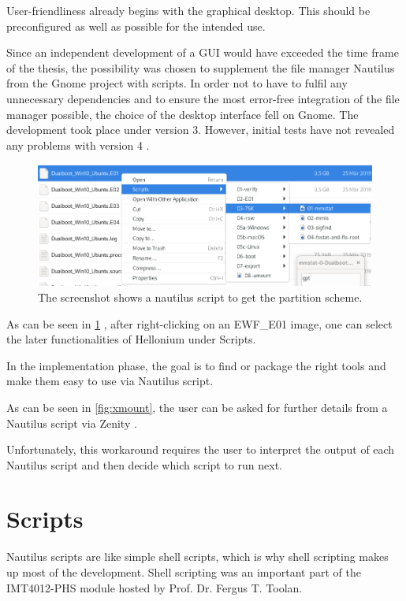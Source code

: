 User-friendliness already begins with the graphical desktop. This should be preconfigured as well as possible for the intended use.

Since an independent development of a GUI would have exceeded the time frame of the thesis, the possibility was chosen to supplement the file manager Nautilus from the Gnome project with scripts. In order not to have to fulfil any unnecessary dependencies and to ensure the most error-free integration of the file manager possible, the choice of the desktop interface fell on Gnome. The development took place under version 3. However, initial tests have not revealed any problems with version 4 \cite{Gnome}.

\begin{figure}[htbp]  %
  \centering
  \includegraphics[width=.5\textwidth]{figures/mmstat-gpt.png}
  \caption[Nautilus script example]{The screenshot shows a nautilus script to get the partition scheme.}
  \label{fig:NautilusScript}
\end{figure}

As can be seen in \cref{fig:NautilusScript} , after right-clicking on an EWF\_E01 image, one can select the later functionalities of Hellonium under Scripts.

In the implementation phase, the goal is to find or package the right tools and make them easy to use via Nautilus script.

As can be seen in \cref{fig:xmount}, the user can be asked for further details from a Nautilus script via Zenity \cite{Zenity}.

Unfortunately, this workaround requires the user to interpret the output of each Nautilus script and then decide which script to run next.

\section{Scripts}

Nautilus scripts are like simple shell scripts, which is why shell scripting makes up most of the development. Shell scripting was an important part of the IMT4012-PHS module hosted by Prof. Dr. Fergus T. Toolan.

